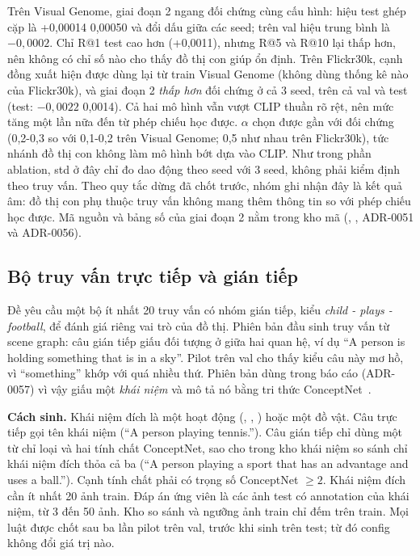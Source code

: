 Trên Visual Genome, giai đoạn 2 ngang đối chứng cùng cấu hình: hiệu \mrr{} test ghép cặp là +0,00014 \pmm{} 0,00050 và đổi dấu giữa các seed; trên val hiệu trung bình là $-0,0002$. Chỉ R@1 test cao hơn (+0,0011), nhưng R@5 và R@10 lại thấp hơn, nên không có chỉ số nào cho thấy đồ thị con giúp ổn định. Trên Flickr30k, cạnh đồng xuất hiện được dùng lại từ train Visual Genome (không dùng thống kê nào của Flickr30k), và giai đoạn 2 \emph{thấp hơn} đối chứng ở cả 3 seed, trên cả val và test (test: $-0,0022$ \pmm{} 0,0014). Cả hai mô hình vẫn vượt CLIP thuần rõ rệt, nên mức tăng một lần nữa đến từ phép chiếu học được. $\alpha$ chọn được gần với đối chứng (0,2-0,3 so với 0,1-0,2 trên Visual Genome; 0,5 như nhau trên Flickr30k), tức nhánh đồ thị con không làm mô hình bớt dựa vào CLIP. Như trong phần ablation, std ở đây chỉ đo dao động theo seed với 3 seed, không phải kiểm định theo truy vấn.
 Theo quy tắc dừng đã chốt trước, nhóm ghi nhận đây là kết quả âm: đồ thị con phụ thuộc truy vấn không mang thêm thông tin so với phép chiếu học được. Mã nguồn và bảng số của giai đoạn 2 nằm trong kho mã (, , ADR-0051 và ADR-0056).

\subsection{Bộ truy vấn trực tiếp và gián tiếp}
\label{sec:kgbench}
Đề yêu cầu một bộ ít nhất 20 truy vấn có nhóm gián tiếp, kiểu \emph{child - plays - football}, để đánh giá riêng vai trò của đồ thị. Phiên bản đầu sinh truy vấn từ scene graph: câu gián tiếp giấu đối tượng ở giữa hai quan hệ, ví dụ ``A person is holding something that is in a sky''. Pilot trên val cho thấy kiểu câu này mơ hồ, vì ``something'' khớp với quá nhiều thứ. Phiên bản dùng trong báo cáo (ADR-0057) vì vậy giấu một \emph{khái niệm} và mô tả nó bằng tri thức ConceptNet~\cite{speer2017conceptnet}.

\textbf{Cách sinh.} Khái niệm đích là một hoạt động (, , ) hoặc một đồ vật. Câu trực tiếp gọi tên khái niệm (``A person playing tennis.''). Câu gián tiếp chỉ dùng một từ chỉ loại và hai tính chất ConceptNet, sao cho trong kho khái niệm so sánh chỉ khái niệm đích thỏa cả ba (``A person playing a sport that has an advantage and uses a ball.''). Cạnh tính chất phải có trọng số ConceptNet $\ge 2$. Khái niệm đích cần ít nhất 20 ảnh train. Đáp án ứng viên là các ảnh test có annotation của khái niệm, từ 3 đến 50 ảnh. Kho so sánh và ngưỡng ảnh train chỉ đếm trên train. Mọi luật được chốt sau ba lần pilot trên val, trước khi sinh trên test; từ đó config không đổi giá trị nào.

